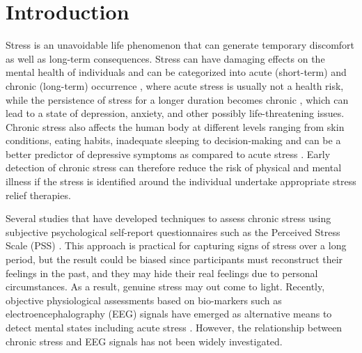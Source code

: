 \documentclass[pdflatex,sn-mathphys]{sn-jnl}%
\theoremstyle{thmstyleone}%
\theoremstyle{thmstyletwo}%
\theoremstyle{thmstylethree}%
\begin{document}


\maketitle
\section{Introduction} \label{sec1}
Stress is an unavoidable life phenomenon that can generate temporary discomfort as well as long-term consequences. Stress can have damaging effects on the mental health of individuals and can be categorized into acute (short-term) and chronic (long-term) occurrence \cite{Khosrowabadi-2011}, where acute stress is usually not a health risk, while the persistence of stress for a longer duration becomes chronic \cite{Khosrowabadi-2011}, which can lead to a state of depression, anxiety, and other possibly life-threatening issues. Chronic stress also affects the human body at different levels ranging from skin conditions, eating habits, inadequate sleeping to decision-making \cite{Thoits2010, Garg2001, Adam2007} and can be a better predictor of depressive symptoms as compared to acute stress \cite{McGonagle1990}. Early detection of chronic stress can therefore reduce the risk of physical and mental illness if the stress is identified around the individual undertake appropriate stress relief therapies. 

Several studies that have developed techniques to assess chronic stress using subjective psychological self-report questionnaires such as the Perceived Stress Scale (PSS) \cite{Cohen-1983}. This approach is practical for capturing signs of stress over a long period, but the result could be biased since participants must reconstruct their feelings in the past, and they may hide their real feelings due to personal circumstances. As a result, genuine stress may out come to light. Recently, objective physiological assessments based on bio-markers such as electroencephalography (EEG) signals have emerged as alternative means to detect mental states including acute stress \cite{Awang2011, Hu2015}. However, the relationship between chronic stress and EEG signals has not been widely investigated.
\end{document}
